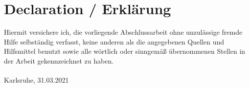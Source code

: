
\chapter*{Declaration / Erkl\"arung}
Hiermit versichere ich, die vorliegende Abschlussarbeit ohne unzulässige fremde Hilfe selbständig verfasst, keine anderen als die angegebenen Quellen und Hilfsmittel benutzt sowie alle wörtlich oder sinngemäß übernommenen Stellen in der Arbeit gekennzeichnet zu haben.\\

\vspace{2cm}
\myname \\
Karlsruhe, 31.03.2021\\
